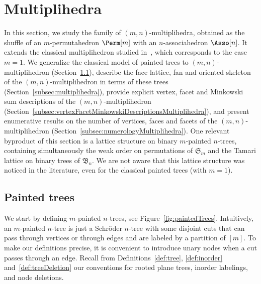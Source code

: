 \documentclass[AHL,Unicode,longabstracts,published]{cedram}
\newcommand{\f}[1]{\mathfrak{#1}}
\begin{document}
\section{Multiplihedra}\label{sec:multiplihedra}

In this section, we study the family of $(m,n)$-multiplihedra, obtained as the shuffle of an $m$-permutahedron $\Perm[m]$ with an $n$-associahedron $\Asso[n]$. It extends the classical multiplihedron studied in~\cite{ArdilaDoker,Forcey-multiplihedra, ForceyLauveSottile, MauWoodward,Stasheff-HSpaces, SaneblidzeUmble-diagonals}, which corresponds to the case $m = 1$. We generalize the classical model of painted trees to $(m,n)$-multiplihedron (Section~\ref{subsec:paintedTrees}), describe the face lattice, fan and oriented skeleton of the $(m,n)$-multiplihedron in terms of these trees (Section~\ref{subsec:multiplihedra}), provide explicit vertex, facet and Minkowski sum descriptions of the $(m,n)$-multiplihedron (Section~\ref{subsec:vertexFacetMinkowskiDescriptionsMultiplihedra}), and present enumerative results on the number of vertices, faces and facets of the $(m,n)$-multiplihedron (Section~\ref{subsec:numerologyMultiplihedra}). One relevant byproduct of this section is a lattice structure on binary $m$-painted $n$-trees, containing simultaneously the weak order on permutations of $\f{S}_m$ and the Tamari lattice on binary trees of $\f{B}_n$. We are not aware that this lattice structure was noticed in the literature, even for the classical painted trees (with $m = 1$).



\subsection{Painted trees}\label{subsec:paintedTrees}

We start by defining $m$-painted $n$-trees, see Figure~\ref{fig:paintedTrees}. Intuitively, an \mbox{$m$-painted} $n$-tree is just a Schr\"oder $n$-tree with some disjoint cuts that can pass through vertices or through edges and are labeled by a partition of $[m]$. To make our definitions precise, it is convenient to introduce unary nodes when a cut passes through an edge. Recall from Definitions~\ref{def:tree}, \ref{def:inorder} and~\ref{def:treeDeletion} our conventions for rooted plane trees, inorder labelings, and node deletions.
\end{document}
